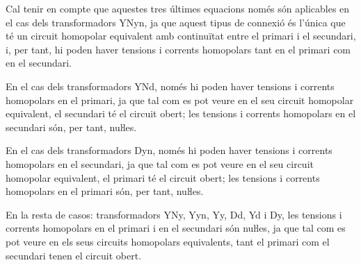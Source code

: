 Cal tenir en compte que aquestes tres últimes equacions  només són aplicables en el cas dels transformadors YNyn, ja que aquest tipus de connexió és l'única que té un circuit homopolar equivalent amb continuïtat entre el primari i el secundari, i, per tant, hi poden haver tensions i corrents homopolars tant en el primari com en el secundari.

En el cas dels transformadors YNd, només hi poden haver tensions i corrents homopolars en el primari, ja que tal com es pot veure en el seu circuit homopolar equivalent, el secundari té el circuit obert; les tensions i corrents homopolars en el secundari són, per tant, nuŀles.


En el cas dels transformadors Dyn, només hi poden haver tensions i corrents homopolars en el secundari, ja que tal com es pot veure en el seu circuit homopolar equivalent, el primari té el circuit obert; les tensions i corrents homopolars en el primari són, per tant, nuŀles.

En la resta de casos: transformadors YNy, Yyn, Yy, Dd, Yd i Dy, les tensions i corrents homopolars en el primari i en el secundari són  nuŀles, ja que tal com es pot veure en els seus circuits homopolars equivalents, tant el primari com el secundari tenen el circuit obert.



